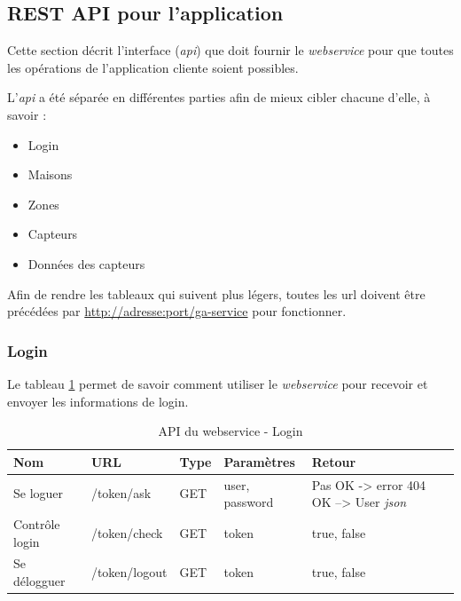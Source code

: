 
\subsection{REST API pour l'application} %
\label{sub:rest_api_pour_l_application}
Cette section décrit l'interface (\emph{\gls{api}}) que doit fournir le \emph{\gls{webservice}} pour que toutes les opérations de l'application cliente soient possibles.

\medskip

L'\emph{\gls{api}} a été séparée en différentes parties afin de mieux cibler chacune d'elle, à savoir : 

\medskip

\begin{itemize}
	\item Login
	\item Maisons
	\item Zones
	\item Capteurs
	\item Données des capteurs
\end{itemize}

\medskip

Afin de rendre les tableaux qui suivent plus légers, toutes les \gls{url} doivent être précédées par \url{http://adresse:port/ga-service} pour fonctionner.

\subsubsection{Login}
Le tableau \ref{tab:apiLogin} permet de savoir comment utiliser le \emph{\gls{webservice}} pour recevoir et envoyer les informations de login.

\begin{table}[H]
\begin{tabularx}{\textwidth}{|X|X|X|X|X|}
  \hline
  \bf{Nom}  & \bf{URL} & \bf{Type} & \bf{Paramètres} & \bf{Retour} \\
  \hline  
  Se loguer  & /token/ask & GET &  user, password & Pas OK -> error 404 OK --> User \emph{\gls{json}}\\
  \hline  
  Contrôle login & /token/check & GET & token  & true, false\\
  \hline  
  Se délogguer & /token/logout & GET & token  & true, false\\
  \hline  
\end{tabularx}
\caption{API du webservice - Login}
\label{tab:apiLogin}
\end{table}

